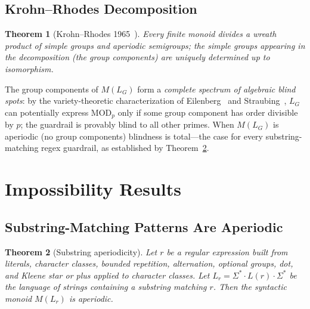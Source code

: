\documentclass[letterpaper,twocolumn,10pt]{article}
\newtheorem{theorem}{Theorem}[section]
\theoremstyle{definition}
\theoremstyle{remark}
\begin{document}
\subsection{Krohn--Rhodes Decomposition}\label{sec:krohn-rhodes}

\begin{theorem}[Krohn--Rhodes 1965~{\cite{krohnrhodes1965}}]\label{thm:kr-classical}
Every finite monoid divides a wreath product of simple groups and aperiodic
semigroups; the simple groups appearing in the decomposition (the
\emph{group components}) are uniquely determined up to isomorphism.
\end{theorem}

The group components of $M(L_G)$ form a \emph{complete spectrum of algebraic
blind spots}: by the variety-theoretic characterization of
Eilenberg~\cite{eilenberg1976} and Straubing~\cite{straubing1994}, $L_G$ can
potentially express $\mathrm{MOD}_p$ only if some group component has order
divisible by $p$; the guardrail is provably blind to all other primes.
When $M(L_G)$ is aperiodic (no group components) blindness is total---the
case for every substring-matching regex guardrail, as established by
Theorem~\ref{thm:substring-aperiodic}.

\section{Impossibility Results}\label{sec:blindness-theorem}

\subsection{Substring-Matching Patterns Are Aperiodic}\label{sec:substring-aperiodic}

\begin{theorem}[Substring aperiodicity]\label{thm:substring-aperiodic}
Let $r$ be a regular expression built from literals, character classes,
bounded repetition, alternation, optional groups, dot, and Kleene star or plus
applied to character classes.
Let $L_r = \Sigma^* \cdot L(r) \cdot \Sigma^*$ be the language of strings
containing a substring matching $r$.
Then the syntactic monoid $M(L_r)$ is aperiodic.
\end{theorem}
\end{document}
